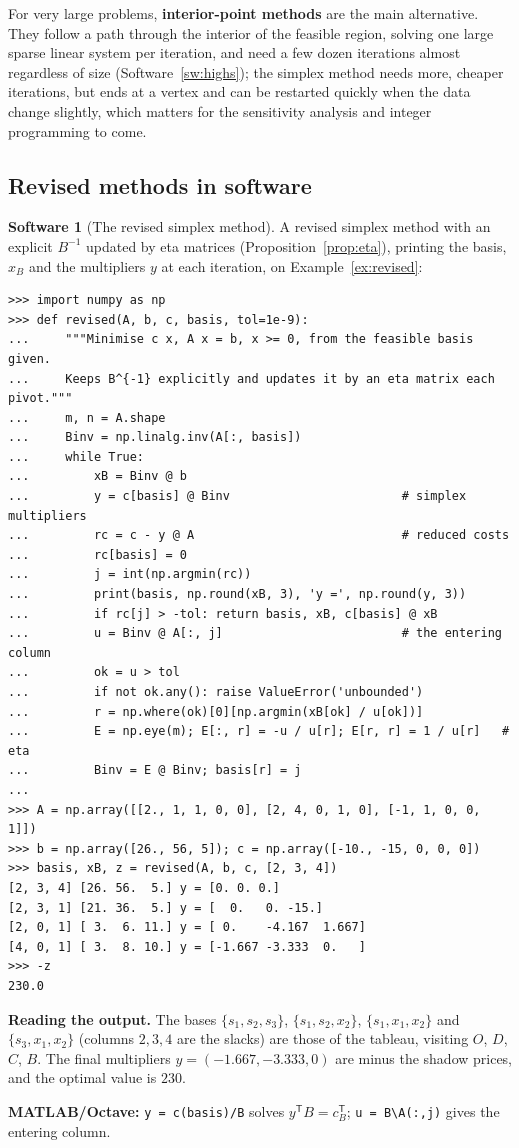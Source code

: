 \documentclass[11pt,a4paper]{article}
\numberwithin{equation}{section}
\theoremstyle{definition}
\newtheorem{software}[thm]{Software}
\begin{document}
For very large problems, \textbf{interior-point methods} are the main alternative. They follow a path through the interior of the feasible region, solving one large sparse linear system per iteration, and need a few dozen iterations almost regardless of size (Software~\ref{sw:highs}); the simplex method needs
more, cheaper iterations, but ends at a vertex and can be restarted quickly when the data change slightly, which matters for the sensitivity analysis and integer programming to come.

\subsection{Revised methods in software}
\label{ssec:software4}

\begin{software}[The revised simplex method]
\label{sw:revised}
A revised simplex method with an explicit $B^{-1}$ updated by eta matrices (Proposition~\ref{prop:eta}), printing the basis, $x_B$ and the multipliers $y$ at each iteration, on Example~\ref{ex:revised}:
{\small\begin{verbatim}
>>> import numpy as np
>>> def revised(A, b, c, basis, tol=1e-9):
...     """Minimise c x, A x = b, x >= 0, from the feasible basis given.
...     Keeps B^{-1} explicitly and updates it by an eta matrix each pivot."""
...     m, n = A.shape
...     Binv = np.linalg.inv(A[:, basis])
...     while True:
...         xB = Binv @ b
...         y = c[basis] @ Binv                        # simplex multipliers
...         rc = c - y @ A                             # reduced costs
...         rc[basis] = 0
...         j = int(np.argmin(rc))
...         print(basis, np.round(xB, 3), 'y =', np.round(y, 3))
...         if rc[j] > -tol: return basis, xB, c[basis] @ xB
...         u = Binv @ A[:, j]                         # the entering column
...         ok = u > tol
...         if not ok.any(): raise ValueError('unbounded')
...         r = np.where(ok)[0][np.argmin(xB[ok] / u[ok])]
...         E = np.eye(m); E[:, r] = -u / u[r]; E[r, r] = 1 / u[r]   # eta
...         Binv = E @ Binv; basis[r] = j
...
>>> A = np.array([[2., 1, 1, 0, 0], [2, 4, 0, 1, 0], [-1, 1, 0, 0, 1]])
>>> b = np.array([26., 56, 5]); c = np.array([-10., -15, 0, 0, 0])
>>> basis, xB, z = revised(A, b, c, [2, 3, 4])
[2, 3, 4] [26. 56.  5.] y = [0. 0. 0.]
[2, 3, 1] [21. 36.  5.] y = [  0.   0. -15.]
[2, 0, 1] [ 3.  6. 11.] y = [ 0.    -4.167  1.667]
[4, 0, 1] [ 3.  8. 10.] y = [-1.667 -3.333  0.   ]
>>> -z
230.0
\end{verbatim}}
\textbf{Reading the output.} The bases $\{s_1, s_2, s_3\}$, $\{s_1, s_2, x_2\}$, $\{s_1, x_1, x_2\}$ and $\{s_3, x_1, x_2\}$ (columns $2, 3, 4$ are the slacks) are those of the tableau, visiting $O$, $D$, $C$, $B$. The final multipliers $y = (-1.667, -3.333, 0)$ are minus the shadow prices, and the optimal value is $230$.

\textbf{MATLAB/Octave:} \texttt{y = c(basis)/B} solves $y^{\mathsf T}B = c_B^{\mathsf T}$; \texttt{u = B\textbackslash A(:,j)} gives the entering column.
\end{software}
\end{document}
